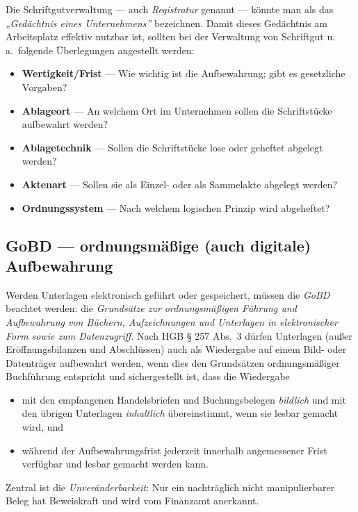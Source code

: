 \documentclass[11pt, a4paper]{article}
\begin{document}
Die Schriftgutverwaltung --- auch \emph{Registratur} genannt --- könnte man als das
\emph{„Gedächtnis eines Unternehmens”} bezeichnen. Damit dieses Gedächtnis am
Arbeitsplatz effektiv nutzbar ist, sollten bei der Verwaltung von Schriftgut u.\,a.\
folgende Überlegungen angestellt werden:

\begin{itemize}
  \item \textbf{Wertigkeit/Frist} --- Wie wichtig ist die Aufbewahrung; gibt es gesetzliche Vorgaben?
  \item \textbf{Ablageort} --- An welchem Ort im Unternehmen sollen die Schriftstücke aufbewahrt werden?
  \item \textbf{Ablagetechnik} --- Sollen die Schriftstücke lose oder geheftet abgelegt werden?
  \item \textbf{Aktenart} --- Sollen sie als Einzel- oder als Sammelakte abgelegt werden?
  \item \textbf{Ordnungssystem} --- Nach welchem logischen Prinzip wird abgeheftet?
\end{itemize}

\subsection{GoBD --- ordnungsmäßige (auch digitale) Aufbewahrung}

Werden Unterlagen elektronisch geführt oder gespeichert, müssen die \emph{GoBD} beachtet
werden: die \emph{Grundsätze zur ordnungsmäßigen Führung und Aufbewahrung von Büchern,
Aufzeichnungen und Unterlagen in elektronischer Form sowie zum Datenzugriff}. Nach
HGB § 257 Abs.~3 dürfen Unterlagen (außer Eröffnungsbilanzen und Abschlüssen) auch als
Wiedergabe auf einem Bild- oder Datenträger aufbewahrt werden, wenn dies den Grundsätzen
ordnungsmäßiger Buchführung entspricht und sichergestellt ist, dass die Wiedergabe

\begin{itemize}
  \item mit den empfangenen Handelsbriefen und Buchungsbelegen \emph{bildlich} und mit den
    übrigen Unterlagen \emph{inhaltlich} übereinstimmt, wenn sie lesbar gemacht wird, und
  \item während der Aufbewahrungsfrist jederzeit innerhalb angemessener Frist verfügbar
    und lesbar gemacht werden kann.
\end{itemize}

Zentral ist die \emph{Unveränderbarkeit}: Nur ein nachträglich nicht manipulierbarer
Beleg hat Beweiskraft und wird vom Finanzamt anerkannt.
\end{document}
